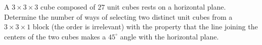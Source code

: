 A $ 3\times3\times3$ cube composed of $ 27$ unit cubes rests on a horizontal plane. Determine the number of ways of selecting two distinct unit cubes from a $ 3\times3\times1$ block (the order is irrelevant) with the property that the line joining the centers of the two cubes makes a $ 45^\circ$ angle with the horizontal plane.